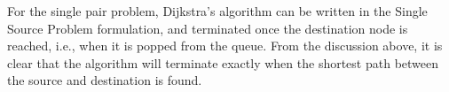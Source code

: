 For the single pair problem, Dijkstra's algorithm can be written in the Single Source Problem formulation, and terminated once the destination node is reached, i.e., when it is popped from the queue. From the discussion above, it is clear that the algorithm will terminate exactly when the shortest path between the source and destination is found.










